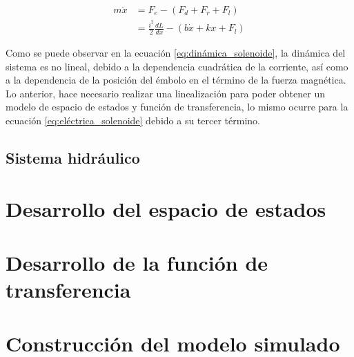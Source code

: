 \documentclass[journal]{IEEEtran}
\begin{document}
\begin{equation}
\begin{aligned}
        m \ddot{x} &= F_e - (F_d + F_r + F_l) \\
                   &= \frac{i^2}{2} \frac{dL}{dx} - (b \dot{x} + k x + F_l)
\end{aligned}
\label{eq:dinámica_solenoide}
\end{equation}

Como se puede observar en la ecuación \ref{eq:dinámica_solenoide}, la dinámica del sistema es no lineal, debido a la dependencia cuadrática 
de la corriente, así como a la dependencia de la posición del émbolo en el término de la fuerza magnética. Lo anterior, hace necesario
realizar una linealización para poder obtener un modelo de espacio de estados y función de transferencia, lo mismo ocurre para 
la ecuación \ref{eq:eléctrica_solenoide} debido a su tercer término.

\subsection{Sistema hidráulico}


\section{Desarrollo del espacio de estados}


\section{Desarrollo de la función de transferencia}


\section{Construcción del modelo simulado}




\end{document}
